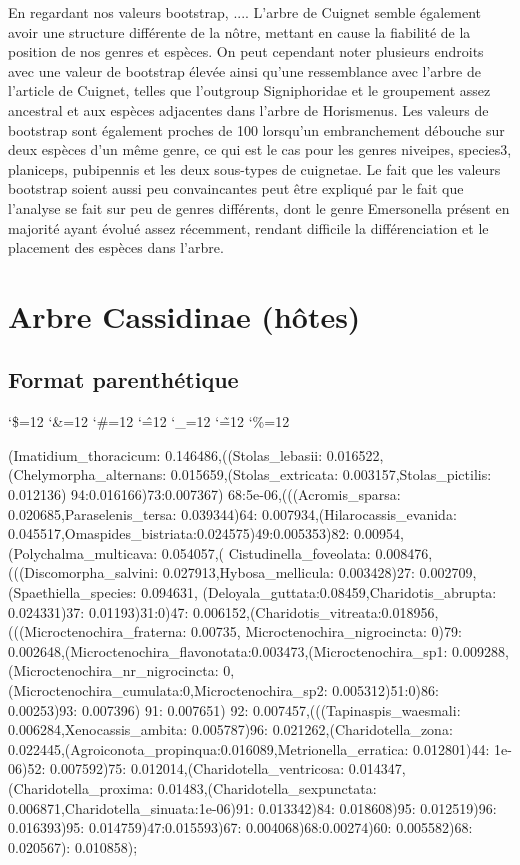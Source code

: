 \documentclass[a4paper, 12pt]{article}
\newenvironment{simplechar}{%
   \catcode`\$=12
   \catcode`\&=12
   \catcode`\#=12
   \catcode`\^=12
   \catcode`\_=12
   \catcode`\~=12
   \catcode`\%=12
}{}
\begin{document}
En regardant nos valeurs bootstrap, .... L’arbre de Cuignet semble également avoir une structure différente de la nôtre, mettant en cause la fiabilité de la position de nos genres et espèces. On peut cependant noter plusieurs endroits avec une valeur de bootstrap élevée ainsi qu’une ressemblance avec l’arbre de l’article de Cuignet, telles que l’outgroup Signiphoridae et le groupement assez ancestral et aux espèces adjacentes dans l’arbre de Horismenus. Les valeurs de bootstrap sont également proches de 100 lorsqu’un embranchement débouche sur deux espèces d’un même genre, ce qui est le cas pour les genres niveipes, species3, planiceps, pubipennis et les deux sous-types de cuignetae.
Le fait que les valeurs bootstrap soient aussi peu convaincantes peut être expliqué par le fait que l’analyse se fait sur peu de genres différents, dont le genre Emersonella présent en majorité ayant évolué assez récemment, rendant difficile la différenciation et le placement des espèces dans l’arbre.

\section{Arbre Cassidinae (hôtes)}
\subsection{Format parenthétique} 

\begin{simplechar}

(Imatidium_thoracicum: 0.146486,((Stolas_lebasii: 0.016522,(Chelymorpha_alternans: 0.015659,(Stolas_extricata: 0.003157,Stolas_pictilis: 0.012136) 94:0.016166)73:0.007367) 68:5e-06,(((Acromis_sparsa: 0.020685,Paraselenis_tersa: 0.039344)64: 0.007934,(Hilarocassis_evanida: 0.045517,Omaspides_bistriata:0.024575)49:0.005353)82: 0.00954,(Polychalma_multicava: 0.054057,( Cistudinella_foveolata: 0.008476,(((Discomorpha_salvini: 0.027913,Hybosa_mellicula: 0.003428)27: 0.002709,(Spaethiella_species: 0.094631, (Deloyala_guttata:0.08459,Charidotis_abrupta: 0.024331)37: 0.01193)31:0)47: 0.006152,(Charidotis_vitreata:0.018956,(((Microctenochira_fraterna: 0.00735, Microctenochira_nigrocincta: 0)79: 0.002648,(Microctenochira_flavonotata:0.003473,(Microctenochira_sp1: 0.009288, (Microctenochira_nr_nigrocincta: 0,(Microctenochira_cumulata:0,Microctenochira_sp2: 0.005312)51:0)86: 0.00253)93: 0.007396) 91: 0.007651) 92: 0.007457,(((Tapinaspis_waesmali: 0.006284,Xenocassis_ambita: 0.005787)96: 0.021262,(Charidotella_zona: 0.022445,(Agroiconota_propinqua:0.016089,Metrionella_erratica: 0.012801)44: 1e-06)52: 0.007592)75: 0.012014,(Charidotella_ventricosa: 0.014347,(Charidotella_proxima: 0.01483,(Charidotella_sexpunctata: 0.006871,Charidotella_sinuata:1e-06)91: 0.013342)84: 0.018608)95: 0.012519)96: 0.016393)95: 0.014759)47:0.015593)67: 0.004068)68:0.00274)60: 0.005582)68: 0.020567): 0.010858);
\end{simplechar}
\end{document}
